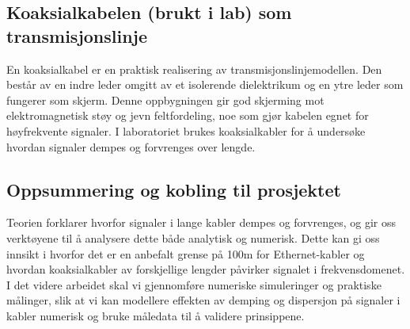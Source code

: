 \subsection{Koaksialkabelen (brukt i lab) som transmisjonslinje}
En koaksialkabel er en praktisk realisering av transmisjonslinjemodellen. Den består av en indre leder omgitt av et isolerende dielektrikum og en ytre leder som fungerer som skjerm. Denne oppbygningen gir god skjerming mot elektromagnetisk støy og jevn feltfordeling, noe som gjør kabelen egnet for høyfrekvente signaler. I laboratoriet brukes koaksialkabler for å undersøke hvordan signaler dempes og forvrenges over lengde.

\subsection{Oppsummering og kobling til prosjektet}

Teorien forklarer hvorfor signaler i lange kabler dempes og forvrenges, og gir oss verktøyene til å analysere dette både analytisk og numerisk. Dette kan gi oss innsikt i hvorfor det er en anbefalt grense på 100m for Ethernet-kabler og hvordan koaksialkabler av forskjellige lengder påvirker signalet i frekvensdomenet. I det videre arbeidet skal vi gjennomføre numeriske simuleringer og praktiske målinger, slik at vi kan modellere effekten av demping og dispersjon på signaler i kabler numerisk og bruke måledata til å validere prinsippene.

